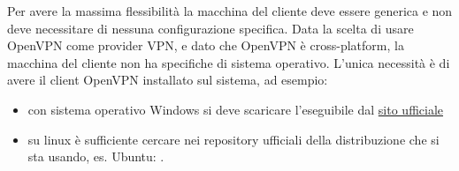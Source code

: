 Per avere la massima flessibilità la macchina del cliente deve essere generica e non deve necessitare di nessuna configurazione specifica. Data la scelta di usare OpenVPN come provider VPN, e dato che OpenVPN è cross-platform, la macchina del cliente non ha specifiche di sistema operativo. L'unica necessità è di avere il client OpenVPN installato sul sistema, ad esempio:


\begin{itemize}
	\item con sistema operativo Windows si deve scaricare l'eseguibile dal \href{https://openvpn.net/client-connect-vpn-for-windows/}{sito ufficiale}
	\item su linux è sufficiente cercare nei repository ufficiali della distribuzione che si sta usando, es. Ubuntu: .
\end{itemize}



